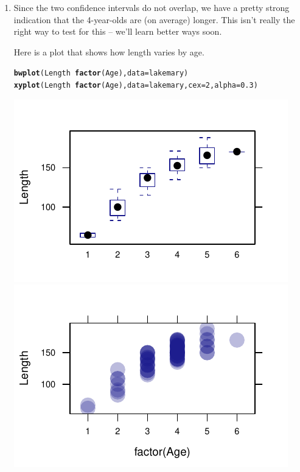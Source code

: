 \documentclass[twoside]{book}\usepackage[]{graphicx}\usepackage[]{xcolor}
\makeatletter
\def\maxwidth{ %
  \ifdim\Gin@nat@width>\linewidth
    \linewidth
  \else
    \Gin@nat@width
  \fi
}
\newcommand{\hlnum}[1]{\textcolor[rgb]{0.686,0.059,0.569}{#1}}%
\newcommand{\hlopt}[1]{\textcolor[rgb]{0,0,0}{#1}}%
\newcommand{\hlstd}[1]{\textcolor[rgb]{0.345,0.345,0.345}{#1}}%
\newcommand{\hlkwc}[1]{\textcolor[rgb]{0.333,0.667,0.333}{#1}}%
\newcommand{\hlkwd}[1]{\textcolor[rgb]{0.737,0.353,0.396}{\textbf{#1}}}%
\newenvironment{kframe}{%
 \def\at@end@of@kframe{}%
 \ifinner\ifhmode%
  \def\at@end@of@kframe{\end{minipage}}%
  \begin{minipage}{\columnwidth}%
 \fi\fi%
 \def\FrameCommand##1{\hskip\@totalleftmargin \hskip-\fboxsep
 \colorbox{shadecolor}{##1}\hskip-\fboxsep
     \hskip-\linewidth \hskip-\@totalleftmargin \hskip\columnwidth}%
 \MakeFramed {\advance\hsize-\width
   \@totalleftmargin\z@ \linewidth\hsize
   \@setminipage}}%
 {\par\unskip\endMakeFramed%
 \at@end@of@kframe}
\newenvironment{knitrout}{}{} %
\makeatother
\begin{document}
\begin{solution}
\begin{enumerate}
\begin{knitrout}
{}



\end{knitrout}
	\item
		Since the two confidence intervals do not overlap, we have a pretty strong
		indication that the 4-year-olds are (on average) longer.  This isn't really
		the right way to test for this -- we'll learn better ways soon.

		Here is a plot that shows how length varies by age.
\begin{knitrout}
\color{fgcolor}\begin{kframe}
\begin{alltt}
\hlkwd{bwplot}\hlstd{(Length} \hlopt{~} \hlkwd{factor}\hlstd{(Age),} \hlkwc{data} \hlstd{= lakemary)}
\hlkwd{xyplot}\hlstd{(Length} \hlopt{~} \hlkwd{factor}\hlstd{(Age),} \hlkwc{data} \hlstd{= lakemary,} \hlkwc{cex} \hlstd{=} \hlnum{2}\hlstd{,} \hlkwc{alpha} \hlstd{=} \hlnum{0.3}\hlstd{)}
\end{alltt}
\end{kframe}

{\centering \includegraphics[width=\maxwidth]{figures/fig-unnamed-chunk-154-1} 
\includegraphics[width=\maxwidth]{figures/fig-unnamed-chunk-154-2} 

}



\end{knitrout}
\end{enumerate}
\end{solution}
\end{document}
